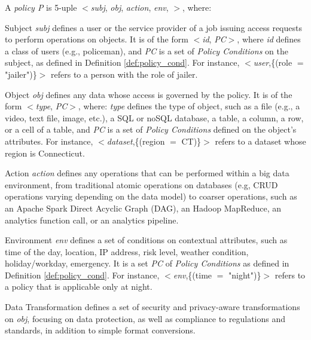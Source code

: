 \begin{definition}[Policy]\label{def:policy_rule}
  A {\it policy P} is 5-uple $<$\textit{subj}, \textit{obj}, \textit{action}, \textit{env}, \textit{\TF}$>$, where:
  \begin{description}
    \item Subject \textit{subj} defines a user or the service provider of a job issuing access requests to perform operations on objects. It is of the form $<$\emph{id}, \emph{PC}$>$, where \emph{id} defines a class of users (e.g., policeman), and \emph{PC} is a set of \emph{Policy Conditions} on the subject, as defined in Definition \ref{def:policy_cond}. For instance, $<$\emph{user},\{(role $=$ "jailer")\}$>$ refers to a person with the role of jailer.

    \item Object \textit{obj} defines any data whose access is governed by the policy. It is of the form $<$\emph{type}, \emph{PC}$>$, where: \emph{type} defines the type of object, such as a file (e.g., a video, text file, image, etc.), a SQL or noSQL database, a table, a column, a row, or a cell of a table, and \emph{PC} is a set of \emph{Policy Conditions} defined on the object's attributes. For instance, $<$\emph{dataset},\{(region $=$ CT)\}$>$ refers to a dataset whose region is Connecticut.

    \item Action \textit{action} defines any operations that can be performed within a big data environment, from traditional atomic operations on databases (e.g, CRUD operations varying depending on the data model) to coarser operations, such as an Apache Spark Direct Acyclic Graph (DAG), an Hadoop MapReduce, an analytics function call, or an analytics pipeline.

    \item Environment \textit{env} defines a set of conditions on contextual attributes, such as time of the day, location, IP address, risk level, weather condition, holiday/workday, emergency. It is a set \emph{PC} of \emph{Policy Conditions} as defined in Definition \ref{def:policy_cond}. For instance, $<$\emph{env},\{(time $=$ "night")\}$>$ refers to a policy that is applicable only at night.

    \item Data Transformation \textit{\TP} defines a set of security and privacy-aware transformations on \textit{obj}, focusing on data protection, as well as compliance to regulations and standards, in addition to simple format conversions.
  \end{description}
\end{definition}


